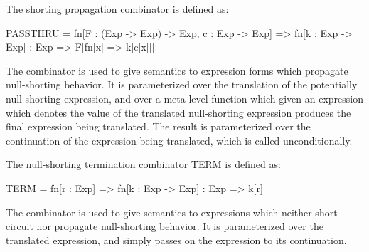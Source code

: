 \documentclass[makeidx]{article}
\begin{document}
{The shorting propagation combinator  is defined as:
\begin{dartCode}
  PASSTHRU = fn[F : (Exp -> Exp) -> Exp, c : Exp -> Exp] =>
               fn[k : Exp -> Exp] : Exp => F[fn[x] => k[c[x]]]
\end{dartCode}

The  combinator is used to give semantics to expression forms which
propagate null-shorting behavior.  It is parameterized over the translation 
of the potentially null-shorting expression, and over a meta-level function 
which given an expression which denotes the value of the translated
null-shorting expression produces the final expression being translated.  The
result is parameterized over the continuation of the expression being
translated, which is called unconditionally.

The null-shorting termination combinator TERM is defined as:
\begin{dartCode}
  TERM = fn[r : Exp] => fn[k : Exp -> Exp] : Exp => k[r]
\end{dartCode}

The  combinator is used to give semantics to expressions which neither
short-circuit nor propagate null-shorting behavior.  It is parameterized over
the translated expression, and simply passes on the expression to its
continuation.

}
\end{document}
